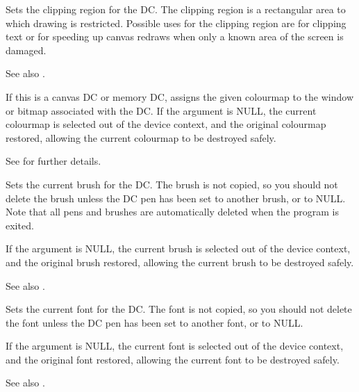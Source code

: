 Sets the clipping region for the DC. The clipping region is a rectangular area
to which drawing is restricted.  Possible uses for the clipping region are for clipping text
or for speeding up canvas redraws when only a known area of the screen is damaged.

See also .

\label{wxdcsetcolourmap}


If this is a canvas DC or memory DC, assigns the given colourmap to the window
or bitmap associated with the DC. If the argument is NULL, the current
colourmap is selected out of the device context, and the original colourmap
restored, allowing the current colourmap to be destroyed safely.

See  for further details.

\label{wxdcsetbrush}


Sets the current brush for the DC.  The brush is not copied, so you should not delete
the brush unless the DC pen has been set to another brush, or to NULL. Note that
all pens and brushes are automatically deleted when the program is exited.

If the argument is NULL, the current brush is selected out of the device
context, and the original brush restored, allowing the current brush to
be destroyed safely.

See also .

\label{wxdcsetfont}


Sets the current font for the DC. The font is not copied, so you should not delete
the font unless the DC pen has been set to another font, or to NULL.

If the argument is NULL, the current font is selected out of the device
context, and the original font restored, allowing the current font to
be destroyed safely.

See also .

\label{wxdcsetlogicalfunction}


